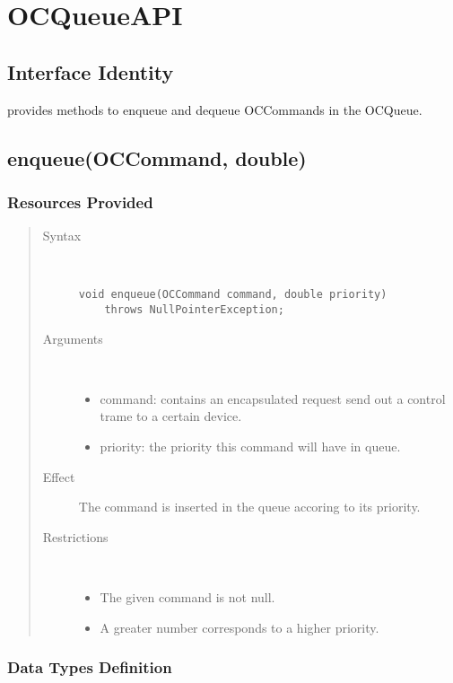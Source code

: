 \section{OCQueueAPI}

\subsection{Interface Identity}

\npar {} provides methods to enqueue and dequeue
OCCommands in the OCQueue.

\subsection{enqueue(OCCommand, double)}

\subsubsection{Resources Provided}

\begin{quote}
	\begin{description}
		\item[Syntax] \ 
		\begin{verbatim}
void enqueue(OCCommand command, double priority) 
    throws NullPointerException;
		\end{verbatim}
		\item[Arguments] \
		\begin{itemize}
			\item command: contains an encapsulated request send out a control trame to
			a certain device.
			\item priority: the priority this command will have in queue. 
		\end{itemize}
		\item[Effect] The command is inserted in the queue accoring to its priority.
		\item[Restrictions] \ 
		\begin{itemize}
			\item The given command is not null.
			\item A greater number corresponds to a higher priority. 
		\end{itemize}
	\end{description} 
\end{quote}

\subsubsection{Data Types Definition}

